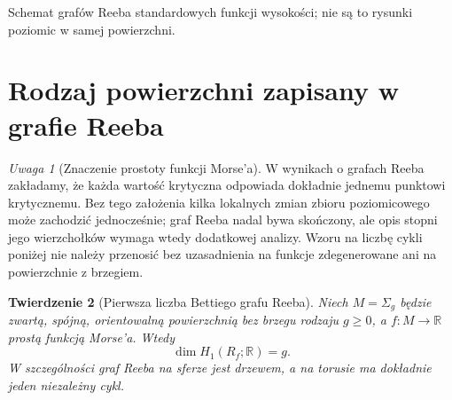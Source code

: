 \documentclass[11pt,a4paper]{report}
\numberwithin{equation}{section}
\theoremstyle{plain}
\newtheorem{twierdzenie}{Twierdzenie}[section]
\theoremstyle{definition}
\theoremstyle{remark}
\newtheorem{uwaga}[twierdzenie]{Uwaga}
\begin{document}
\begin{samepage}
\begin{center}
\begin{minipage}{.96\linewidth}\centering
{}\par\smallskip

{\footnotesize Schemat grafów Reeba standardowych funkcji wysokości;
nie są to rysunki poziomic w samej powierzchni.}
\end{minipage}
\end{center}
\end{samepage}

\section{Rodzaj powierzchni zapisany w grafie Reeba}
\label{sec:tg-reeb-genus}

\begin{uwaga}[Znaczenie prostoty funkcji Morse'a]
W wynikach o grafach Reeba zakładamy, że każda wartość
krytyczna odpowiada dokładnie jednemu punktowi krytycznemu.
Bez tego założenia kilka lokalnych zmian zbioru poziomicowego
może zachodzić jednocześnie; graf Reeba nadal bywa skończony,
ale opis stopni jego wierzchołków wymaga wtedy dodatkowej
analizy. Wzoru na liczbę cykli poniżej nie należy przenosić
bez uzasadnienia na funkcje zdegenerowane ani na powierzchnie
z brzegiem.
\end{uwaga}

\begin{twierdzenie}[Pierwsza liczba Bettiego grafu Reeba]
\label{thm:tg-reeb-betti}
Niech $M=\Sigma_g$ będzie zwartą, spójną, orientowalną
powierzchnią bez brzegu rodzaju $g\ge0$, a
$f:M\to\mathbb R$ prostą funkcją Morse'a. Wtedy
\[
\dim H_1(R_f;\mathbb R)=g.
\]
W szczególności graf Reeba na sferze jest drzewem,
a na torusie ma dokładnie jeden niezależny cykl.
\end{twierdzenie}
\end{document}
